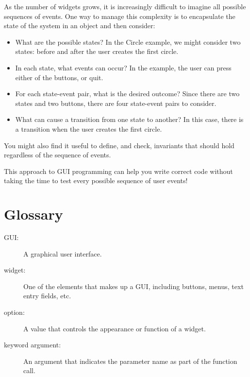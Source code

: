 \documentclass[10pt]{book}
\begin{document}
\begin{CJK}{UTF8}{gbsn}
As the number of widgets grows, it is increasingly difficult to
imagine all possible sequences of events.  One way to manage this 
complexity is to encapsulate the state of the system in an object
and then consider:

\begin{itemize}

\item What are the possible states?  In the Circle example, we
might consider two states: before and after the user creates the
first circle.

\item In each state, what events can occur?  In the example,
the user can press either of the buttons, or quit.

\item For each state-event pair, what is the desired outcome?
Since there are two states and two buttons, there are four
state-event pairs to consider.

\item What can cause a transition from one state to another?
In this case, there is a transition when the user creates
the first circle.

\end{itemize}

You might also find it useful to define, and check, invariants that
should hold regardless of the sequence of events.

This approach to GUI programming can help you write correct
code without taking the time to test every possible sequence
of user events!


\section{Glossary}

\begin{description}

\item[GUI:] A graphical user interface.

\item[widget:] One of the elements that makes up a GUI, including
buttons, menus, text entry fields, etc. 

\item[option:] A value that controls the appearance or function of
a widget.

\item[keyword argument:] An argument that indicates the parameter
name as part of the function call.


\end{description}
\end{CJK}
\end{document}
